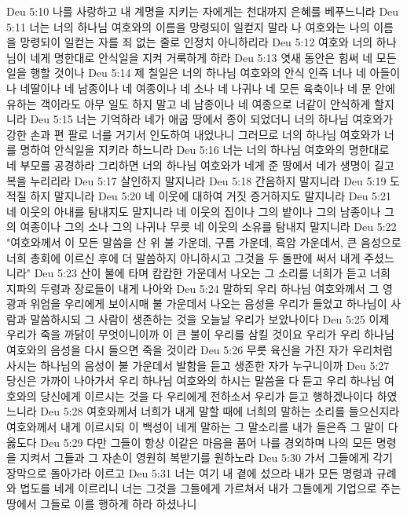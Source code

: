 Deu 5:10  나를 사랑하고 내 계명을 지키는 자에게는 천대까지 은혜를 베푸느니라
Deu 5:11  너는 너의 하나님 여호와의 이름을 망령되이 일컫지 말라 나 여호와는 나의 이름을 망령되이 일컫는 자를 죄 없는 줄로 인정치 아니하리라
Deu 5:12  여호와 너의 하나님이 네게 명한대로 안식일을 지켜 거룩하게 하라
Deu 5:13  엿새 동안은 힘써 네 모든 일을 행할 것이나
Deu 5:14  제 칠일은 너의 하나님 여호와의 안식 인즉 너나 네 아들이나 네딸이나 네 남종이나 네 여종이나 네 소나 네 나귀나 네 모든 육축이나 네 문 안에 유하는 객이라도 아무 일도 하지 말고 네 남종이나 네 여종으로 너같이 안식하게 할지니라
Deu 5:15  너는 기억하라 네가 애굽 땅에서 종이 되었더니 너의 하나님 여호와가 강한 손과 편 팔로 너를 거기서 인도하여 내었나니 그러므로 너의 하나님 여호와가 너를 명하여 안식일을 지키라 하느니라
Deu 5:16  너는 너의 하나님 여호와의 명한대로 네 부모를 공경하라 그리하면 너의 하나님 여호와가 네게 준 땅에서 네가 생명이 길고 복을 누리리라
Deu 5:17  살인하지 말지니라
Deu 5:18  간음하지 말지니라
Deu 5:19  도적질 하지 말지니라
Deu 5:20  네 이웃에 대하여 거짓 증거하지도 말지니라
Deu 5:21  네 이웃의 아내를 탐내지도 말지니라 네 이웃의 집이나 그의 밭이나 그의 남종이나 그의 여종이나 그의 소나 그의 나귀나 무릇 네 이웃의 소유를 탐내지 말지니라
Deu 5:22  "여호와께서 이 모든 말씀을 산 위 불 가운데, 구름 가운데, 흑암 가운데서, 큰 음성으로 너희 총회에 이르신 후에 더 말씀하지 아니하시고 그것을 두 돌판에 써서 내게 주셨느니라"
Deu 5:23  산이 불에 타며 캄캄한 가운데서 나오는 그 소리를 너희가 듣고 너희 지파의 두령과 장로들이 내게 나아와
Deu 5:24  말하되 우리 하나님 여호와께서 그 영광과 위엄을 우리에게 보이시매 불 가운데서 나오는 음성을 우리가 들었고 하나님이 사람과 말씀하시되 그 사람이 생존하는 것을 오늘날 우리가 보았나이다
Deu 5:25  이제 우리가 죽을 까닭이 무엇이니이까 이 큰 불이 우리를 삼킬 것이요 우리가 우리 하나님 여호와의 음성을 다시 들으면 죽을 것이라
Deu 5:26  무릇 육신을 가진 자가 우리처럼 사시는 하나님의 음성이 불 가운데서 발함을 듣고 생존한 자가 누구니이까
Deu 5:27  당신은 가까이 나아가서 우리 하나님 여호와의 하시는 말씀을 다 듣고 우리 하나님 여호와의 당신에게 이르시는 것을 다 우리에게 전하소서 우리가 듣고 행하겠나이다 하였느니라
Deu 5:28  여호와께서 너희가 내게 말할 때에 너희의 말하는 소리를 들으신지라 여호와께서 내게 이르시되 이 백성이 네게 말하는 그 말소리를 내가 들은즉 그 말이 다 옳도다
Deu 5:29  다만 그들이 항상 이같은 마음을 품어 나를 경외하며 나의 모든 명령을 지켜서 그들과 그 자손이 영원히 복받기를 원하노라
Deu 5:30  가서 그들에게 각기 장막으로 돌아가라 이르고
Deu 5:31  너는 여기 내 곁에 섰으라 내가 모든 명령과 규례와 법도를 네게 이르리니 너는 그것을 그들에게 가르쳐서 내가 그들에게 기업으로 주는 땅에서 그들로 이를 행하게 하라 하셨나니
